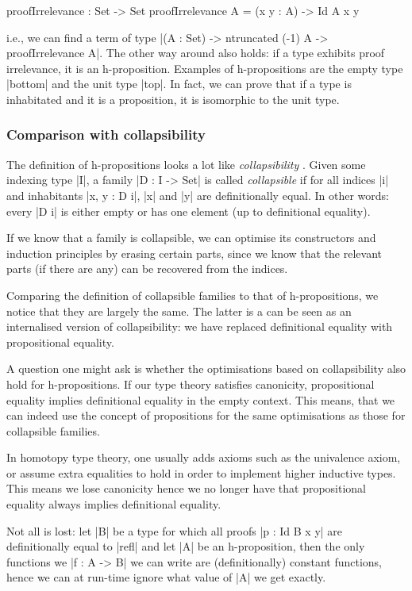 \begin{code}
  proofIrrelevance : Set -> Set
  proofIrrelevance A = (x y : A) -> Id A x y
\end{code}

i.e., we can find a term of type |(A : Set) -> ntruncated (-1) A ->
proofIrrelevance A|. The other way around also holds: if a type
exhibits proof irrelevance, it is an h-proposition. Examples of
h-propositions are the empty type |bottom| and the unit type |top|. In
fact, we can prove that if a type is inhabitated and it is a
proposition, it is isomorphic to the unit type.

\subsubsection{Comparison with collapsibility}


The definition of h-propositions looks a lot like
\emph{collapsibility} \citep{collapsibility}. Given some indexing type
|I|, a family |D : I -> Set| is called \emph{collapsible} if for all
indices |i| and inhabitants |x, y : D i|, |x| and |y| are
definitionally equal. In other words: every |D i| is either empty or
has one element (up to definitional equality).

If we know that a family is collapsible, we can optimise its
constructors and induction principles by erasing certain parts, since
we know that the relevant parts (if there are any) can be recovered
from the indices.

Comparing the definition of collapsible families to that of
h-propositions, we notice that they are largely the same. The latter
is a can be seen as an internalised version of collapsibility: we have
replaced definitional equality with propositional equality.

A question one might ask is whether the optimisations based on
collapsibility also hold for h-propositions. If our type theory
satisfies canonicity, propositional equality implies definitional
equality in the empty context. This means, that we can indeed use the
concept of propositions for the same optimisations as those for
collapsible families.

In homotopy type theory, one usually adds axioms such as the
univalence axiom, or assume extra equalities to hold in order to
implement higher inductive types. This means we lose canonicity hence
we no longer have that propositional equality always implies
definitional equality.

Not all is lost: let |B| be a type for which all proofs |p : Id B x y|
are definitionally equal to |refl| and let |A| be an h-proposition,
then the only functions we |f : A -> B| we can write are
(definitionally) constant functions, hence we can at run-time ignore
what value of |A| we get exactly.

